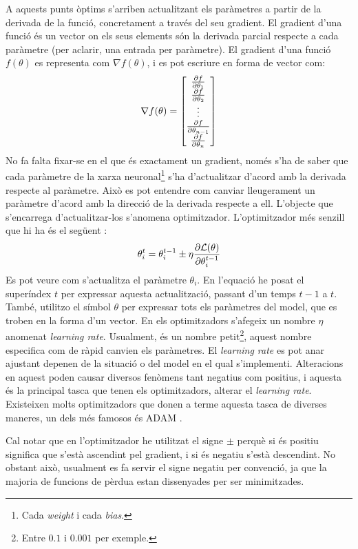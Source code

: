 A aquests punts òptims s'arriben actualitzant els paràmetres a partir de la derivada de la funció, concretament a través del seu gradient. El gradient d'una funció és un vector on els seus elements són la derivada parcial respecte a cada paràmetre (per aclarir, una entrada per paràmetre). El gradient d'una funció $f(\theta)$ es representa com $\nabla f(\theta)$, i es pot escriure en forma de vector com:
$$
\nabla f(\theta) = \begin{bmatrix}
	\pdv{f}{\theta_1} \\
	\pdv{f}{\theta_2} \\
	\vdots \\
	\pdv{f}{\theta_{n-1}} \\
	\pdv{f}{\theta_{n}}
\end{bmatrix}
$$
No fa falta fixar-se en el que és exactament un gradient, només s'ha de saber que cada paràmetre de la xarxa neuronal\footnote{Cada \textit{weight} i cada \textit{bias}.} s'ha d'actualitzar d'acord amb la derivada respecte al paràmetre. Això es pot entendre com canviar lleugerament un paràmetre d'acord amb la direcció de la derivada respecte a ell. L'objecte que s'encarrega d'actualitzar-los s'anomena optimitzador. L'optimitzador més senzill que hi ha és el següent \cite{3b1b}:
\begin{equation}
	\theta_{i}^t = \theta_{i}^{t-1} \pm \eta\pdv{\mathcal{L}(\theta)}{\theta_{i}^{t-1}}
	\label{eq:optimizator}
\end{equation}
Es pot veure com s'actualitza el paràmetre $\theta_i$. En l'equació he posat el superíndex $t$ per expressar aquesta actualització, passant d'un temps $t-1$ a $t$. També, utilitzo el símbol $\theta$ per expressar tots els paràmetres del model, que es troben en la forma d'un vector. En els optimitzadors s'afegeix un nombre $\eta$ anomenat \textit{learning rate}. Usualment, és un nombre petit\footnote{Entre $0.1$ i $0.001$ per exemple.}, aquest nombre especifica com de ràpid canvien els paràmetres. El \textit{learning rate} es pot anar ajustant depenen de la situació o del model en el qual s'implementi. Alteracions en aquest poden causar diversos fenòmens tant negatius com positius, i aquesta és la principal tasca que tenen els optimitzadors, alterar el \textit{learning rate}. Existeixen molts optimitzadors que donen a terme aquesta tasca de diverses maneres, un dels més famosos és ADAM \cite{adam}. 

Cal notar que en l'optimitzador he utilitzat el signe $\pm$ perquè si és positiu significa que s'està ascendint pel gradient, i si és negatiu s'està descendint. No obstant això, usualment es fa servir el signe negatiu per convenció, ja que la majoria de funcions de pèrdua estan dissenyades per ser minimitzades. 

